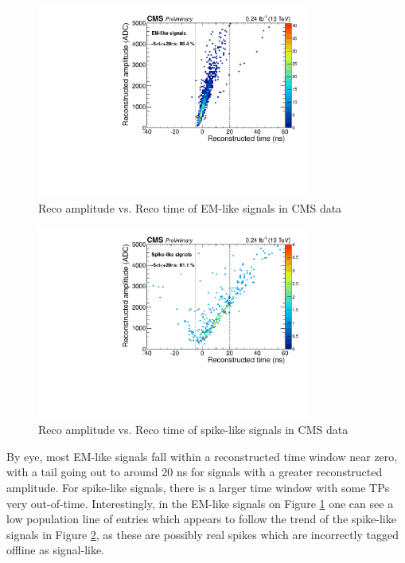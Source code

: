 \begin{figure}[H]
    \centering
    \includegraphics[width=0.8\textwidth]{Images/ECAL/DW/EM_TPs.pdf}
    \caption{Reco amplitude vs. Reco time of EM-like signals in CMS data}
    \label{fig:ampvstime_EMlike}
\end{figure}

\begin{figure}[H]
    \centering
    \includegraphics[width=0.8\textwidth]{Images/ECAL/DW/Spike_TPs.pdf}
    \caption{Reco amplitude vs. Reco time of spike-like signals in CMS data}
    \label{fig:ampvstime_Spikelike}
\end{figure}

By eye, most EM-like signals fall within a reconstructed time window near zero, with a tail going out to around 20 ns for signals with a greater reconstructed amplitude. For spike-like signals, there is a larger time window with some TPs very out-of-time. Interestingly, in the EM-like signals on Figure \ref{fig:ampvstime_EMlike} one can see a low population line of entries which appears to follow the trend of the spike-like signals in Figure \ref{fig:ampvstime_Spikelike}, as these are possibly real spikes which are incorrectly tagged offline as signal-like. 

